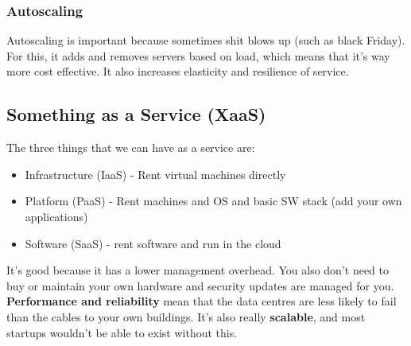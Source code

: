 \documentclass[11pt,a4paper,titlepage,dvipsnames,cmyk]{scrartcl}
\begin{document}
\subsubsection{Autoscaling}%
\label{ssub:Autoscaling}
Autoscaling is important because sometimes shit blows up (such as
black Friday). For this, it adds and removes servers based on load, which
means that it's way more cost effective. It also increases elasticity and
resilience of service.

\subsection{Something as a Service (XaaS)}%
\label{sub:XaaS}

The three things that we can have as a service are:
\begin{itemize}
    \item Infrastructure (IaaS) - Rent virtual machines directly
    \item Platform (PaaS) - Rent machines and OS and basic SW stack (add
        your own applications)
    \item Software (SaaS) - rent software and run in the cloud
\end{itemize}

It's good because it has a lower management overhead. You also don't need
to buy or maintain your own hardware and security updates are managed for
you. \textbf{Performance and reliability} mean that the data centres are
less likely to fail than the cables to your own buildings. It's also
really \textbf{scalable}, and most startups wouldn't be able to exist
without this.
\end{document}
